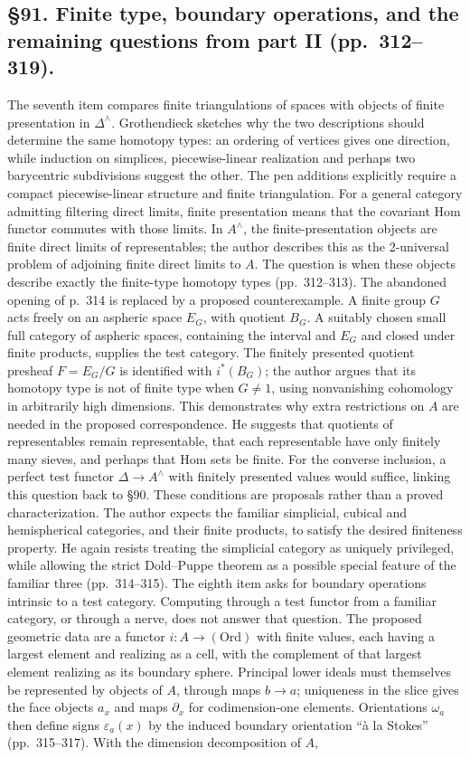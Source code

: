\documentclass[10pt,oneside]{book}
\begin{document}
\subsection*{\S91. Finite type, boundary operations, and the remaining questions from part II (pp.\ 312--319).}
The seventh item compares finite triangulations of spaces with objects of finite presentation in $\Delta^\wedge$. Grothendieck sketches why the two descriptions should determine the same homotopy types: an ordering of vertices gives one direction, while induction on simplices, piecewise-linear realization and perhaps two barycentric subdivisions suggest the other. The pen additions explicitly require a compact piecewise-linear structure and finite triangulation. For a general category admitting filtering direct limits, finite presentation means that the covariant Hom functor commutes with those limits. In $A^\wedge$, the finite-presentation objects are finite direct limits of representables; the author describes this as the 2-universal problem of adjoining finite direct limits to $A$. The question is when these objects describe exactly the finite-type homotopy types (pp.\ 312--313). The abandoned opening of p.\ 314 is replaced by a proposed counterexample. A finite group $G$ acts freely on an aspheric space $E_G$, with quotient $B_G$. A suitably chosen small full category of aspheric spaces, containing the interval and $E_G$ and closed under finite products, supplies the test category. The finitely presented quotient presheaf $F=E_G/G$ is identified with $i^*(B_G)$; the author argues that its homotopy type is not of finite type when $G\ne1$, using nonvanishing cohomology in arbitrarily high dimensions. This demonstrates why extra restrictions on $A$ are needed in the proposed correspondence. He suggests that quotients of representables remain representable, that each representable have only finitely many sieves, and perhaps that Hom sets be finite. For the converse inclusion, a perfect test functor $\Delta\to A^\wedge$ with finitely presented values would suffice, linking this question back to \S90. These conditions are proposals rather than a proved characterization. The author expects the familiar simplicial, cubical and hemispherical categories, and their finite products, to satisfy the desired finiteness property. He again resists treating the simplicial category as uniquely privileged, while allowing the strict Dold--Puppe theorem as a possible special feature of the familiar three (pp.\ 314--315). The eighth item asks for boundary operations intrinsic to a test category. Computing through a test functor from a familiar category, or through a nerve, does not answer that question. The proposed geometric data are a functor $i:A\to(\mathrm{Ord})$ with finite values, each having a largest element and realizing as a cell, with the complement of that largest element realizing as its boundary sphere. Principal lower ideals must themselves be represented by objects of $A$, through maps $b\to a$; uniqueness in the slice gives the face objects $a_x$ and maps $\partial_x$ for codimension-one elements. Orientations $\omega_a$ then define signs $\varepsilon_a(x)$ by the induced boundary orientation “à la Stokes” (pp.\ 315--317). With the dimension decomposition of $A$, 
\end{document}
